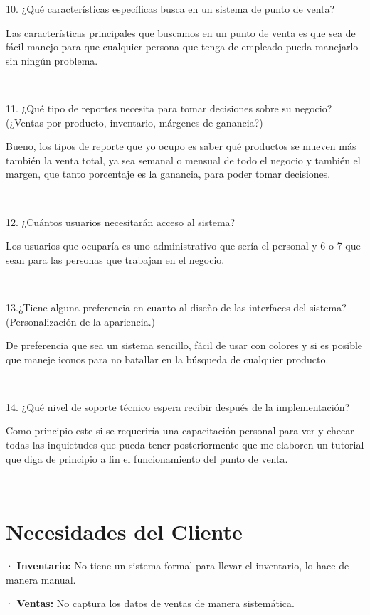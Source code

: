 \documentclass[12pt]{report}
\begin{document}
\large {
10. ¿Qué características específicas busca en un sistema de punto de venta?

Las características principales que buscamos en un punto de venta es que sea de fácil manejo para que cualquier persona que tenga de empleado pueda manejarlo sin ningún problema.}\\[0.25cm]

\large {
11. ¿Qué tipo de reportes necesita para tomar decisiones sobre su negocio? (¿Ventas por producto, inventario, márgenes de ganancia?)

Bueno, los tipos de reporte que yo ocupo es saber qué productos se mueven más también la venta total, ya sea semanal o mensual de todo el negocio y también el margen, que tanto porcentaje es la ganancia, para poder tomar decisiones.}\\[0.25cm]

\large {
12. ¿Cuántos usuarios necesitarán acceso al sistema? 

Los usuarios que ocuparía es uno administrativo que sería el personal y 6 o 7 que sean para las personas que trabajan en el negocio.}\\[0.25cm]

\large {
13.¿Tiene alguna preferencia en cuanto al diseño de las interfaces del sistema? (Personalización de la apariencia.)

De preferencia que sea un sistema sencillo, fácil de usar con colores y si es posible que maneje iconos para no batallar en la búsqueda de cualquier producto.}\\[0.25cm]

\large {
14. ¿Qué nivel de soporte técnico espera recibir después de la implementación?

Como principio este si se requeriría una capacitación personal para ver y checar todas las inquietudes que pueda tener posteriormente que me elaboren un tutorial que diga de principio a fin el funcionamiento del punto de venta.}\\[0.25cm]

\newpage
{}
\chapter{Necesidades del Cliente}

· \textbf{Inventario:} No tiene un sistema formal para llevar el inventario, lo hace de manera manual.

· \textbf{Ventas:} No captura los datos de ventas de manera sistemática.
\end{document}
